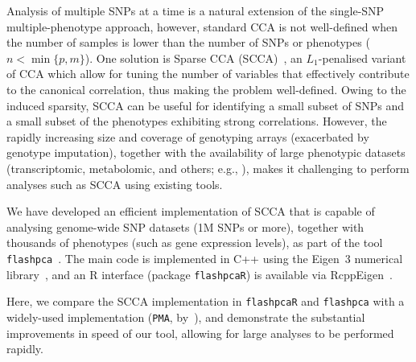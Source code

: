 \documentclass{bioinfo}
\begin{document}
Analysis of multiple SNPs at a time is a natural extension of the
single-SNP multiple-phenotype approach, however, standard CCA is not
well-defined when the number of samples is lower than the number of
SNPs or phenotypes ($n<\min\{p, m\}$).  One solution is Sparse CCA
(SCCA)~\citep{Witten2009c,Witten2009b,Parkhomenko2009}, an $L_1$-penalised
variant of CCA which allow for tuning the number of variables that
effectively contribute to the canonical correlation, thus making the problem
well-defined. Owing to the induced sparsity, SCCA can be useful for identifying
a small subset of SNPs and a small subset of the phenotypes exhibiting strong
correlations.  However, the rapidly increasing size and coverage of genotyping
arrays (exacerbated by genotype imputation), together with the availability
of large phenotypic datasets (transcriptomic, metabolomic, and others; e.g.,
\citet{Bartel2015,TheGTExConsortium2015}), makes it challenging to perform
analyses such as SCCA using existing tools.

We have developed an efficient implementation of SCCA that is capable
of analysing genome-wide SNP datasets (1M SNPs or more), together with
thousands of phenotypes (such as gene expression levels), as part of the
tool \texttt{flashpca}~\citep{Abraham2014}. The main code is implemented
in \textsf{C++} using the Eigen~3 numerical library~\citep{eigenweb},
and an \textsf{R} interface (package \texttt{flashpcaR}) is available via
RcppEigen~\citep{Bates2013}.

Here, we compare the SCCA implementation in \texttt{flashpcaR} and
\texttt{flashpca} with a widely-used implementation (\texttt{PMA},
by~\citet{Witten2013}), and demonstrate the substantial improvements in
speed of our tool, allowing for large analyses to be performed rapidly.
\end{document}
